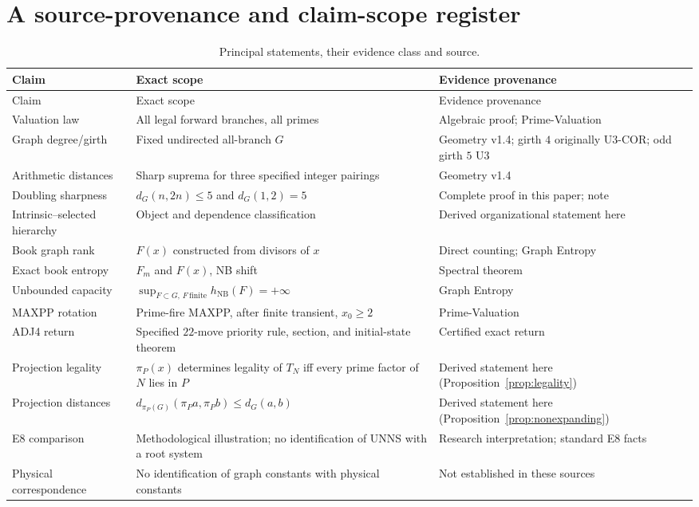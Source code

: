 \documentclass[11pt,a4paper]{article}
\theoremstyle{definition}\newtheorem{definition}[theorem]{Definition}
\newcommand{\NB}{\mathrm{NB}}
\begin{document}
\section{A source-provenance and claim-scope register}
\label{app:scope}
\begin{longtable}{@{}p{33mm}p{70mm}p{36mm}@{}}
\caption{Principal statements, their evidence class and source.}\label{tab:register}\\
\toprule
Claim & Exact scope & Evidence provenance\\\midrule\endfirsthead
\toprule Claim & Exact scope & Evidence provenance\\\midrule\endhead
Valuation law & All legal forward branches, all primes & Algebraic proof; Prime-Valuation \cite{prime}\\
Graph degree/girth & Fixed undirected all-branch $G$ & Geometry v1.4; girth $4$ originally U3-COR; odd girth $5$ U3 \cite{geometry,u3,u3cor}\\
Arithmetic distances & Sharp suprema for three specified integer pairings & Geometry v1.4 \cite{geometry}\\
Doubling sharpness & $d_G(n,2n)\le5$ and $d_G(1,2)=5$ & Complete proof in this paper; note \cite{doublingnote}\\
Intrinsic--selected hierarchy & Object and dependence classification & Derived organizational statement here\\
Book graph rank & $F(x)$ constructed from divisors of $x$ & Direct counting; Graph Entropy \cite{entropy}\\
Exact book entropy & $F_m$ and $F(x)$, NB shift & Spectral theorem \cite{entropy}\\
Unbounded capacity & $\sup_{F\subset G,\,F\ \mathrm{finite}}h_{\NB}(F)=+\infty$ & Graph Entropy \cite{entropy}\\
MAXPP rotation & Prime-fire MAXPP, after finite transient, $x_0\ge2$ & Prime-Valuation \cite{prime}\\
ADJ4 return & Specified $22$-move priority rule, section, and initial-state theorem & Certified exact return \cite{adj}\\
Projection legality & $\pi_P(x)$ determines legality of $T_N$ iff every prime factor of $N$ lies in $P$ & Derived statement here (Proposition~\ref{prop:legality})\\
Projection distances & $d_{\pi_P(G)}(\pi_Pa,\pi_Pb)\le d_G(a,b)$ & Derived statement here (Proposition~\ref{prop:nonexpanding})\\
E8 comparison & Methodological illustration; no identification of UNNS with a root system & Research interpretation; standard E8 facts \cite{conwaysloane,humphreys}\\
Physical correspondence & No identification of graph constants with physical constants & Not established in these sources\\
\bottomrule
\end{longtable}
\end{document}
